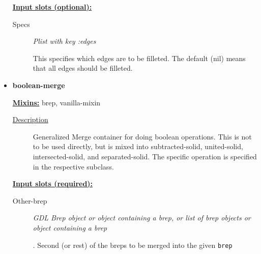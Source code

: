 \documentclass [11pt]{book}
\begin{document}
\begin{itemize}
\textbf{
\underline{Input slots (optional):}}

\begin{description}

\item [Specs]
\emph{Plist with key :edges}

 This specifies which edges are to be filleted. The default (nil)
means that all edges should be filleted.




\end{description}







\item {}
\label{prim:boolean-merge}
\textbf{boolean-merge}


\textbf{
\underline{Mixins:}} brep, vanilla-mixin





\begin{description}

\item [
\underline{Description}]


Generalized Merge container for doing boolean operations. This is not to be used directly, but is 
mixed into subtracted-solid, united-solid, intersected-solid, and separated-solid. 
The specific operation is specified in the respective subclass.



\end{description}








\textbf{
\underline{Input slots (required):}}

\begin{description}

\item [Other-brep]
\emph{GDL Brep object or object containing a brep, or list of brep objects or object containing a brep}

.
Second (or rest) of the breps to be merged into the given \texttt{brep}




\end{description}







\end{itemize}
\end{document}
